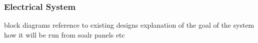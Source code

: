 \subsubsection{Electrical System}

block diagrams
reference to existing designs
explanation of the goal of the system
how it will be run from soalr panels
etc
